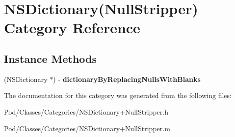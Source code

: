\hypertarget{category_n_s_dictionary_07_null_stripper_08}{}\section{N\+S\+Dictionary(Null\+Stripper) Category Reference}
\label{category_n_s_dictionary_07_null_stripper_08}
\subsection*{Instance Methods}
\begin{DoxyCompactItemize}
\item 
(N\+S\+Dictionary $\ast$) -\/ {\bfseries dictionary\+By\+Replacing\+Nulls\+With\+Blanks}\hypertarget{category_n_s_dictionary_07_null_stripper_08_aa41c1c083b600485ea35d4d8fd4709ce}{}\label{category_n_s_dictionary_07_null_stripper_08_aa41c1c083b600485ea35d4d8fd4709ce}

\end{DoxyCompactItemize}


The documentation for this category was generated from the following files\+:\begin{DoxyCompactItemize}
\item 
Pod/\+Classes/\+Categories/N\+S\+Dictionary+\+Null\+Stripper.\+h\item 
Pod/\+Classes/\+Categories/N\+S\+Dictionary+\+Null\+Stripper.\+m\end{DoxyCompactItemize}
